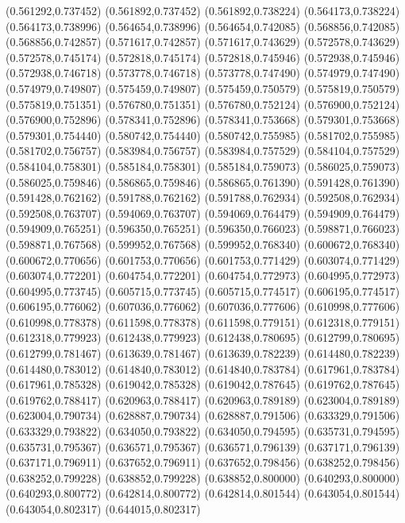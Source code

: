 (0.561292,0.737452)
(0.561892,0.737452)
(0.561892,0.738224)
(0.564173,0.738224)
(0.564173,0.738996)
(0.564654,0.738996)
(0.564654,0.742085)
(0.568856,0.742085)
(0.568856,0.742857)
(0.571617,0.742857)
(0.571617,0.743629)
(0.572578,0.743629)
(0.572578,0.745174)
(0.572818,0.745174)
(0.572818,0.745946)
(0.572938,0.745946)
(0.572938,0.746718)
(0.573778,0.746718)
(0.573778,0.747490)
(0.574979,0.747490)
(0.574979,0.749807)
(0.575459,0.749807)
(0.575459,0.750579)
(0.575819,0.750579)
(0.575819,0.751351)
(0.576780,0.751351)
(0.576780,0.752124)
(0.576900,0.752124)
(0.576900,0.752896)
(0.578341,0.752896)
(0.578341,0.753668)
(0.579301,0.753668)
(0.579301,0.754440)
(0.580742,0.754440)
(0.580742,0.755985)
(0.581702,0.755985)
(0.581702,0.756757)
(0.583984,0.756757)
(0.583984,0.757529)
(0.584104,0.757529)
(0.584104,0.758301)
(0.585184,0.758301)
(0.585184,0.759073)
(0.586025,0.759073)
(0.586025,0.759846)
(0.586865,0.759846)
(0.586865,0.761390)
(0.591428,0.761390)
(0.591428,0.762162)
(0.591788,0.762162)
(0.591788,0.762934)
(0.592508,0.762934)
(0.592508,0.763707)
(0.594069,0.763707)
(0.594069,0.764479)
(0.594909,0.764479)
(0.594909,0.765251)
(0.596350,0.765251)
(0.596350,0.766023)
(0.598871,0.766023)
(0.598871,0.767568)
(0.599952,0.767568)
(0.599952,0.768340)
(0.600672,0.768340)
(0.600672,0.770656)
(0.601753,0.770656)
(0.601753,0.771429)
(0.603074,0.771429)
(0.603074,0.772201)
(0.604754,0.772201)
(0.604754,0.772973)
(0.604995,0.772973)
(0.604995,0.773745)
(0.605715,0.773745)
(0.605715,0.774517)
(0.606195,0.774517)
(0.606195,0.776062)
(0.607036,0.776062)
(0.607036,0.777606)
(0.610998,0.777606)
(0.610998,0.778378)
(0.611598,0.778378)
(0.611598,0.779151)
(0.612318,0.779151)
(0.612318,0.779923)
(0.612438,0.779923)
(0.612438,0.780695)
(0.612799,0.780695)
(0.612799,0.781467)
(0.613639,0.781467)
(0.613639,0.782239)
(0.614480,0.782239)
(0.614480,0.783012)
(0.614840,0.783012)
(0.614840,0.783784)
(0.617961,0.783784)
(0.617961,0.785328)
(0.619042,0.785328)
(0.619042,0.787645)
(0.619762,0.787645)
(0.619762,0.788417)
(0.620963,0.788417)
(0.620963,0.789189)
(0.623004,0.789189)
(0.623004,0.790734)
(0.628887,0.790734)
(0.628887,0.791506)
(0.633329,0.791506)
(0.633329,0.793822)
(0.634050,0.793822)
(0.634050,0.794595)
(0.635731,0.794595)
(0.635731,0.795367)
(0.636571,0.795367)
(0.636571,0.796139)
(0.637171,0.796139)
(0.637171,0.796911)
(0.637652,0.796911)
(0.637652,0.798456)
(0.638252,0.798456)
(0.638252,0.799228)
(0.638852,0.799228)
(0.638852,0.800000)
(0.640293,0.800000)
(0.640293,0.800772)
(0.642814,0.800772)
(0.642814,0.801544)
(0.643054,0.801544)
(0.643054,0.802317)
(0.644015,0.802317)

